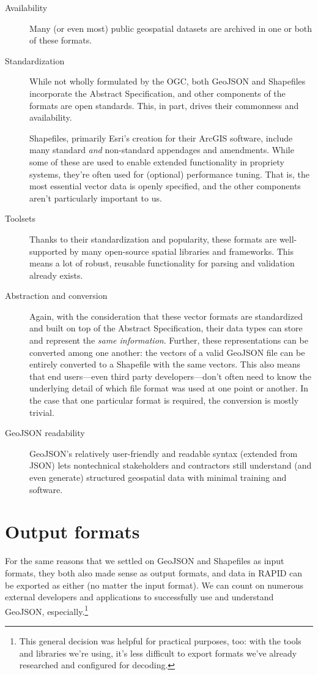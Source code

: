 \begin{description}
  \item[Availability] Many (or even most) public geospatial datasets are archived in one or both of these formats.
  \item[Standardization] While not wholly formulated by the OGC, both GeoJSON and Shapefiles incorporate the Abstract Specification, and other components of the formats are open standards. This, in part, drives their commonness and availability.
  
Shapefiles, primarily Esri's creation for their ArcGIS software, include many standard \textit{and} non-standard appendages and amendments. While some of these are used to enable extended functionality in propriety systems, they're often used for (optional) performance tuning. That is, the most essential vector data is openly specified, and the other components aren't particularly important to us.

\item[Toolsets] Thanks to their standardization and popularity, these formats  are well-supported by many open-source spatial libraries and frameworks. This means a lot of robust, reusable functionality for parsing and validation already exists.

\item[Abstraction and conversion] Again, with the consideration that these vector formats are standardized and built on top of the Abstract Specification, their data types can store and represent the \textit{same information}. Further, these representations can be converted among one another: the vectors of a valid GeoJSON file can be entirely converted to a Shapefile with the same vectors. This also means that end users---even third party developers---don't often need to know the underlying detail of which file format was used at one point or another. In the case that one particular format is required, the conversion is mostly trivial.

\item[GeoJSON readability] GeoJSON's relatively user-friendly and readable syntax (extended from JSON) lets nontechnical stakeholders and contractors still understand (and even generate) structured geospatial data with minimal training and software.

\end{description}

\section{Output formats}
For the same reasons that we settled on GeoJSON and Shapefiles as input formats, they both also made sense as output formats, and data in RAPID can be exported as either (no matter the input format). We can count on numerous external developers and applications to successfully use and understand GeoJSON, especially.\footnote{This general decision was helpful for practical purposes, too: with the tools and libraries we're using, it's less difficult to export formats we've already researched and configured for decoding.}

